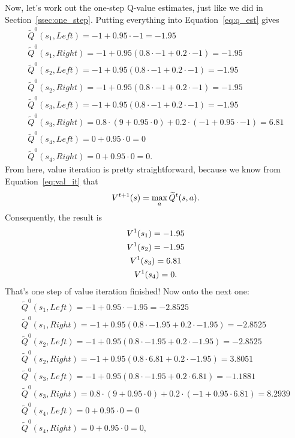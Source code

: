 \documentclass[a4paper]{article}
\begin{document}
Now, let's work out the one-step Q-value estimates, just like we did
in Section~\ref{ssec:one_step}.
Putting everything into Equation~\ref{eq:q_est} gives
\begin{gather*}
  \widetilde{Q}^0(s_1, Left)  = -1 + 0.95 \cdot -1 = -1.95 \\
  \widetilde{Q}^0(s_1, Right) = -1 + 0.95 (0.8 \cdot -1 + 0.2 \cdot -1) = -1.95 \\
  \widetilde{Q}^0(s_2, Left)  = -1 + 0.95 (0.8 \cdot -1 + 0.2 \cdot -1) = -1.95 \\
  \widetilde{Q}^0(s_2, Right) = -1 + 0.95 (0.8 \cdot -1 + 0.2 \cdot -1) = -1.95 \\
  \widetilde{Q}^0(s_3, Left)  = -1 + 0.95 (0.8 \cdot -1 + 0.2 \cdot -1) = -1.95 \\
  \widetilde{Q}^0(s_3, Right) = 0.8 \cdot (9 + 0.95 \cdot 0) + 0.2 \cdot (-1 + 0.95 \cdot -1) = 6.81 \\
  \widetilde{Q}^0(s_4, Left)  = 0 + 0.95 \cdot 0 = 0 \\
  \widetilde{Q}^0(s_4, Right) = 0 + 0.95 \cdot 0 = 0 .
\end{gather*}
From here, value iteration is pretty straightforward, because we know from
Equation~\ref{eq:val_it} that
\begin{equation*}
  V^{t+1}(s) = \operatorname*{max}_a \widetilde{Q}^t(s, a) .
\end{equation*}
Consequently, the result is
\begin{gather*}
  V^1(s_1) = -1.95 \\
  V^1(s_2) = -1.95 \\
  V^1(s_3) = 6.81 \\
  V^1(s_4) = 0 .
\end{gather*}
That's one step of value iteration finished!
Now onto the next one:
\begin{gather*}
  \widetilde{Q}^0(s_1, Left)  = -1 + 0.95 \cdot -1.95 = -2.8525 \\
  \widetilde{Q}^0(s_1, Right) = -1 + 0.95 (0.8 \cdot -1.95 + 0.2 \cdot -1.95) = -2.8525 \\
  \widetilde{Q}^0(s_2, Left) = -1 + 0.95 (0.8 \cdot -1.95 + 0.2 \cdot -1.95) = -2.8525 \\
  \widetilde{Q}^0(s_2, Right) = -1 + 0.95 (0.8 \cdot 6.81 + 0.2 \cdot -1.95) = 3.8051 \\
  \widetilde{Q}^0(s_3, Left)  = -1 + 0.95 (0.8 \cdot -1.95 + 0.2 \cdot 6.81) = -1.1881 \\
  \widetilde{Q}^0(s_3, Right) = 0.8 \cdot (9 + 0.95 \cdot 0) + 0.2 \cdot (-1 + 0.95 \cdot 6.81) = 8.2939 \\
  \widetilde{Q}^0(s_4, Left)  = 0 + 0.95 \cdot 0 = 0 \\
  \widetilde{Q}^0(s_4, Right) = 0 + 0.95 \cdot 0 = 0 ,
\end{gather*}
\end{document}
